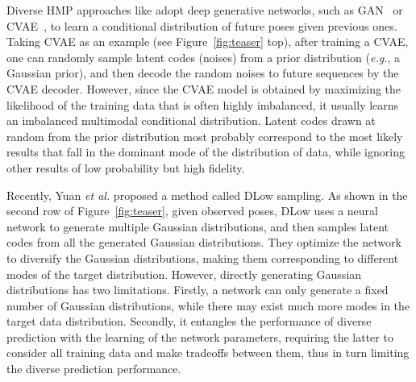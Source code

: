 \documentclass[sigconf,screen,nonacm]{acmart}
\begin{document}
	Diverse HMP approaches like \cite{barsoum2018hp,kundu2019bihmp,yan2018mt} adopt deep generative networks, such as GAN~\cite{goodfellow2014generative} or CVAE~\cite{kingma2013auto}, to learn a conditional distribution of future poses given previous ones. Taking CVAE as an example (see Figure~\ref{fig:teaser} top), after training a CVAE, one can randomly sample latent codes (noises) from a prior distribution (\textit{e.g.}, a Gaussian prior), and then decode the random noises to future sequences by the CVAE decoder. However, since the CVAE model is obtained by maximizing the likelihood of the training data that is often highly imbalanced, it usually learns an imbalanced multimodal conditional distribution. Latent codes drawn at random from the prior distribution most probably correspond to the most likely results that fall in the dominant mode of the distribution of data, while ignoring other results of low probability but high fidelity.
	
	Recently, Yuan \textit{et al.} \cite{yuan2020dlow} proposed a method called DLow sampling. As shown in the second row of Figure~\ref{fig:teaser}, given observed poses, DLow uses a neural network to generate multiple Gaussian distributions, and then samples latent codes from all the generated Gaussian distributions. They optimize the network to diversify the Gaussian distributions, making them corresponding to different modes of the target distribution. However, directly generating Gaussian distributions has two limitations. Firstly, a network can only generate a fixed number of Gaussian distributions, while there may exist much more modes in the target data distribution. Secondly, it entangles the performance of diverse prediction with the learning of the network parameters, requiring the latter to consider all training data and make tradeoffs between them, thus in turn limiting the diverse prediction performance.
	
\end{document}
